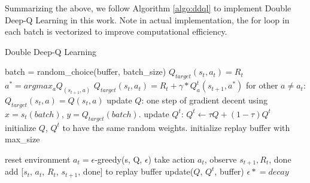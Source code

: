 \documentclass[conference]{IEEEtran}
\newcommand{\asteq}{\mathrel{*}=}
\begin{document}
Summarizing the above, we follow Algorithm \ref{algo:ddql} to implement Double Deep-Q Learning in this work. Note in actual implementation, the for loop in each batch is vectorized to improve computational efficiency.

\begin{algorithm}[h!]
	\caption{Double Deep-Q Learning}
	\begin{algorithmic}
		\State batch = random\_choice(buffer, batch\_size)
				\State $Q_{target}(s_t, a_t) = R_t$
			\Else
				\State $a^* = argmax_a Q_(s_{t+1}, a)$
				\State $Q_{target}(s_t, a_t) = R_t + \gamma * Q^t_a(s_{t+1}, a^*)$
			\EndIf
			\State for other $a\neq a_t$: $Q_{target}(s_t, a) = Q(s_t, a)$
		\EndFor
		\State update $Q$: one step of gradient decent using $x=s_t(batch)$, $y=Q_{target}(batch)$.
		\State update $Q^t$: $Q^t \leftarrow \tau Q + (1-\tau) Q^t$
		\EndFunction
		\\
		\State initialize $Q$, $Q^t$ to have the same random weights.
		\State initialize replay buffer with max\_size
		
			\State reset environment
				\State $a_t = \epsilon$-greedy(s, Q, $\epsilon$)
				\State take action $a_t$, observe $s_{t+1}, R_{t}$, done
				\State add [$s_t$, $a_t$, $R_t$, $s_{t+1}$, done] to replay buffer
				\State update($Q$, $Q^t$, buffer)
			\EndFor			
			\State $\epsilon \asteq decay$
		\EndFor
		\EndFunction
	\end{algorithmic}
	\label{algo:ddql}
\end{algorithm}
\end{document}
